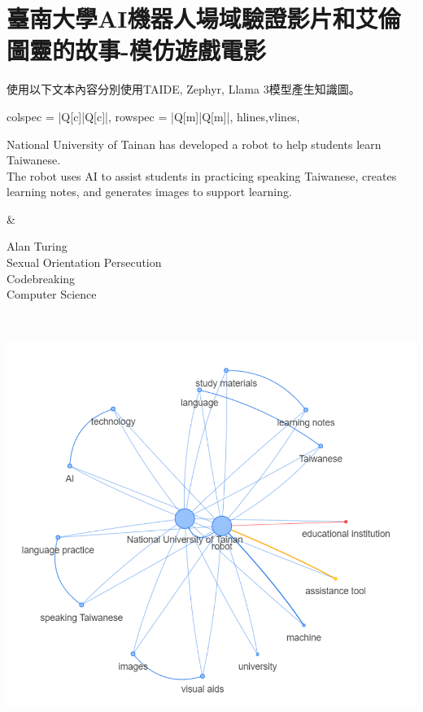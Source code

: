 \chapter{臺南大學AI機器人場域驗證影片和艾倫圖靈的故事-模仿遊戲電影}

使用以下文本內容分別使用TAIDE, Zephyr, Llama 3模型產生知識圖。
\begin{longtblr}[
    caption = {臺南大學AI機器人場域驗證影片和艾倫圖靈的故事文本內容及知識圖},
]{
    colspec = {|Q[c]|Q[c]|},
    rowspec = {|Q[m]|Q[m]|},
    hlines,vlines,
}
\begin{minipage}{0.4\textwidth}
    \raggedright
    \vspace{5pt}
    \small 
    National University of Tainan has developed a robot to help students learn Taiwanese.\\
    The robot uses AI to assist students in practicing speaking Taiwanese, creates learning notes, and generates images to support learning.
    \vspace{5pt}
\end{minipage} &  
\begin{minipage}{0.4\textwidth}
    \raggedright
    \vspace{5pt}
    \small 
    Alan Turing\\
    Sexual Orientation Persecution\\
    Codebreaking\\
    Computer Science
    \vspace{5pt}
\end{minipage} \\
\begin{minipage}[t][5cm][b]{0.3\textwidth}
            \centering
            \includegraphics[width=\textwidth]{images/w2/w2_taide_1.png}\\

\end{minipage}
\end{longtblr}
